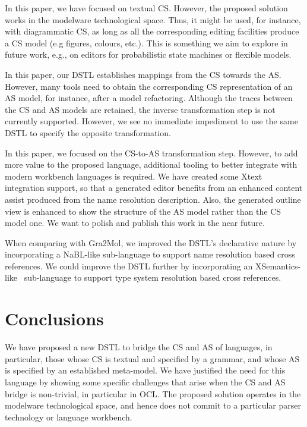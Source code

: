 \documentclass{llncs}
\begin{document}
In this paper, we have focused on textual CS. However, the proposed solution works in the modelware technological space. Thus, it might be used, for instance, with diagrammatic CS, as long as all the corresponding editing facilities produce a CS model (e.g figures, colours, etc.). This is something we aim to explore in future work, e.g., on editors for probabilistic state machines or flexible models.

In this paper, our DSTL establishes mappings from the CS towards the AS. However, many tools need to obtain the corresponding CS representation of an AS model, for instance, after a model refactoring. Although the traces between the CS and AS models are retained, the inverse transformation step is not currently supported. However, we see no immediate impediment to use the same DSTL to specify the opposite transformation. 

In this paper, we focused on the CS-to-AS transformation step. However, to add more value to the proposed language, additional tooling to better integrate with modern workbench languages is required. We have created some Xtext integration support, so that a generated editor benefits from an enhanced content assist produced from the name resolution description. Also, the generated outline view is enhanced to show the structure of the AS model rather than the CS model one. We want to polish and publish this work in the near future.

When comparing with Gra2Mol, we improved the DSTL's declarative nature by incorporating a NaBL-like sub-language to support name resolution based cross references. We could improve the DSTL further by incorporating an XSemantics-like~\cite{bettini2013xsemantics} sub-language to support type system resolution based cross references.

\section{Conclusions}
\label{sec:conclusions}

We have proposed a new DSTL to bridge the CS and AS of languages, in particular, those whose CS is textual and specified by a grammar, and whose AS is specified by an established meta-model. We have justified the need for this language by showing some specific challenges that arise when the CS and AS bridge is non-trivial, in particular in OCL. The proposed solution operates in the modelware technological space, and hence does not commit to a particular parser technology or language workbench. 
\end{document}
